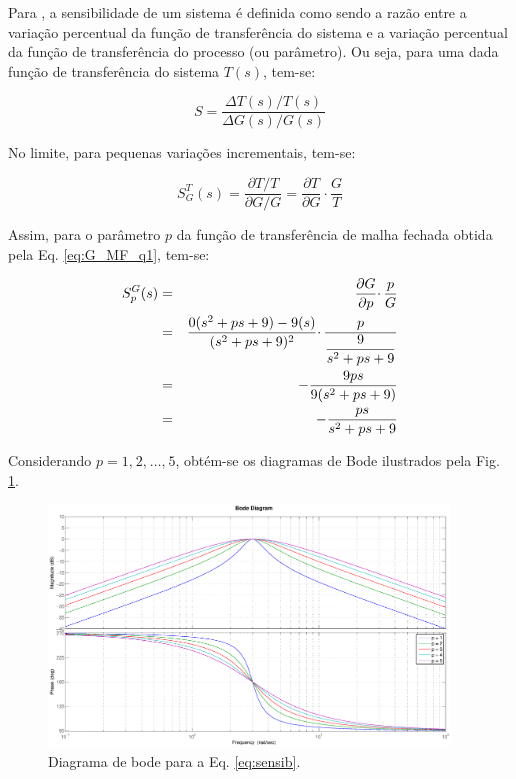 Para , a sensibilidade de um sistema é definida como sendo
a razão entre a variação percentual da função de transferência do sistema e a
variação percentual da função de transferência do processo (ou parâmetro). Ou
seja, para uma dada função de transferência do sistema $T(s)$, tem-se:

\begin{equation}
S = \frac{\Delta T(s)/T(s)}{\Delta G(s)/G(s)}
\end{equation}

No limite, para pequenas variações incrementais, tem-se:

\begin{equation}
S_G^T(s) = \frac{\partial T / T}{ \partial G / G} 
         = \frac{\partial T}{\partial G} \cdotp \frac{G}{T}
\end{equation}

Assim, para o parâmetro $p$ da função de transferência de malha fechada
obtida pela Eq. \ref{eq:G_MF_q1}, tem-se:

\begin{eqnarray}
S_p^G(s) & = & \frac{\partial G}{\partial p} \cdotp \frac{p}{G}\nonumber \\
         & = & \frac{0(s^2 + ps + 9) - 9(s)}{(s^2 + ps + 9)^2} \cdotp
               \frac{p}{\displaystyle\frac{9}{s^2 + ps + 9}}\nonumber\\
         & = & - \frac{9ps}{9(s^2 + ps + 9)}\nonumber\\
         & = & - \frac{ps}{s^2 + ps + 9}\label{eq:sensib}
\end{eqnarray}

Considerando $p = 1\text{,}\ 2\text{,}\ \ldots\text{,}\ 5$, obtém-se os
diagramas de Bode ilustrados pela Fig. \ref{fig:diag_bode_sensib}.

\begin{figure}[H]
\centering
    \includegraphics[width=0.95\textwidth]{imgs/questao1/bode_sensib}
    \caption{Diagrama de bode para a Eq. \ref{eq:sensib}.}
    \label{fig:diag_bode_sensib}
\end{figure}

